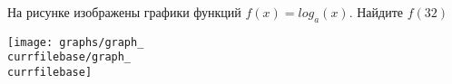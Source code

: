 \begin{ex}
	\begin{condition}
		\begin{minipage}[t]{0.67\textwidth}
			На рисунке изображены графики функций \( f(x)=log_a(x) \). Найдите \( f(32) \)
		\end{minipage}
		\begin{minipage}[c]{0.25\textwidth}
			\texttt{[image: graphs/graph\_\\currfilebase/graph\_\\currfilebase]}
		\end{minipage}
	\end{condition}
\end{ex}